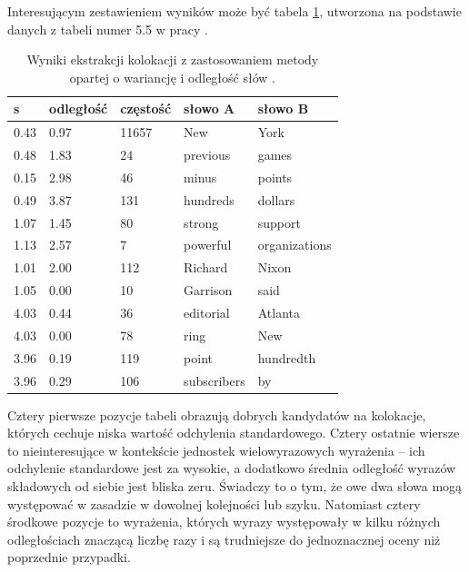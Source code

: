 \par
Interesującym zestawieniem wyników może być tabela \ref{mean_variance_result_table}, utworzona na podstawie danych z tabeli numer 5.5 w pracy \cite[str. 161]{mit}.
\begin{table}[h!]
\centering
\begin{tabular}{l l l | l | l}
	\toprule
	\textbf{s}	& \textbf{odległość}	& \textbf{częstość}	& \textbf{słowo A}		& \textbf{słowo B} 	\\
	\midrule
	0.43		& 0.97					& 11657				& New					& York				\\
	0.48 		& 1.83					& 24				& previous				& games				\\
	0.15 		& 2.98 					& 46				& minus					& points			\\
	0.49 		& 3.87 					& 131				& hundreds				& dollars			\\
	\midrule
	1.07 		& 1.45 					& 80				& strong				& support			\\
	1.13 		& 2.57 					& 7					& powerful				& organizations		\\
	1.01 		& 2.00 					& 112				& Richard				& Nixon				\\
	1.05 		& 0.00 					& 10				& Garrison				& said				\\
	\midrule
	4.03 		& 0.44 					& 36				& editorial				& Atlanta			\\
	4.03 		& 0.00 					& 78				& ring					& New				\\
	3.96 		& 0.19 					& 119				& point					& hundredth			\\
	3.96 		& 0.29 					& 106				& subscribers			& by				\\
	\bottomrule
\end{tabular}
\caption[Wyniki ekstrakcji kolokacji dla metody wariancji i odległości słów]{Wyniki ekstrakcji kolokacji z zastosowaniem metody opartej o wariancję i odległość słów \cite[str. 161]{mit}.}
\label{mean_variance_result_table}
\end{table}

Cztery pierwsze pozycje tabeli obrazują dobrych kandydatów na kolokacje, których cechuje niska wartość odchylenia standardowego.
Cztery ostatnie wiersze to nieinteresujące w kontekście jednostek wielowyrazowych wyrażenia -- ich odchylenie standardowe jest za wysokie, a dodatkowo średnia odległość wyrazów składowych od siebie jest bliska zeru.
Świadczy to o tym, że owe dwa słowa mogą występować w zasadzie w dowolnej kolejności lub szyku.
Natomiast cztery środkowe pozycje to wyrażenia, których wyrazy występowały w kilku różnych odległościach znaczącą liczbę razy \cite[str. 162]{mit} i są trudniejsze do jednoznacznej oceny niż poprzednie przypadki.


